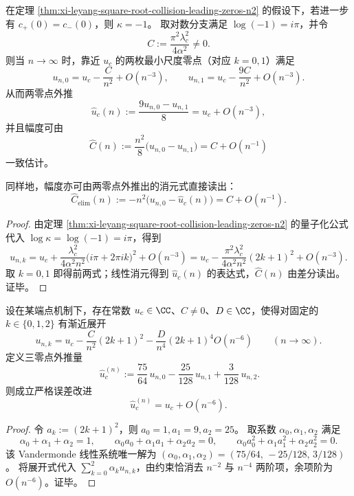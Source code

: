 \begin{corollary}[对称可见性下的两零点外推与幅度消去]\label{cor:xi-leyang-two-leading-zeros-extrapolate-uc}
在定理 \ref{thm:xi-leyang-square-root-collision-leading-zeros-n2} 的假设下，若进一步有 \(c_+(0)=c_-(0)\)，则 \(\kappa=-1\)。
取对数分支满足 \(\log(-1)=i\pi\)，并令
\[
C:=\frac{\pi^2\lambda_c^2}{4\alpha^2}\neq 0.
\]
则当 \(n\to\infty\) 时，靠近 \(u_c\) 的两枚最小尺度零点（对应 \(k=0,1\)）满足
\[
u_{n,0}=u_c-\frac{C}{n^2}+O(n^{-3}),
\qquad
u_{n,1}=u_c-\frac{9C}{n^2}+O(n^{-3}).
\]
从而两零点外推
\[
\widehat u_c(n):=\frac{9u_{n,0}-u_{n,1}}{8}
=u_c+O(n^{-3}),
\]
并且幅度可由
\[
\widehat C(n):=\frac{n^2}{8}\bigl(u_{n,0}-u_{n,1}\bigr)=C+O(n^{-1})
\]
一致估计。
\par
同样地，幅度亦可由两零点外推出的消元式直接读出：
\[
\widehat C_{\mathrm{elim}}(n):=-n^2\bigl(u_{n,0}-\widehat u_c(n)\bigr)=C+O(n^{-1}).
\]
\end{corollary}
\begin{proof}
由定理 \ref{thm:xi-leyang-square-root-collision-leading-zeros-n2} 的量子化公式代入 \(\log\kappa=\log(-1)=i\pi\)，得到
\[
u_{n,k}
=u_c+\frac{\lambda_c^2}{4\alpha^2n^2}\bigl(i\pi+2\pi i k\bigr)^2+O(n^{-3})
=u_c-\frac{\pi^2\lambda_c^2}{4\alpha^2n^2}(2k+1)^2+O(n^{-3}).
\]
取 \(k=0,1\) 即得前两式；线性消元得到 \(\widehat u_c(n)\) 的表达式，\(\widehat C(n)\) 由差分读出。证毕。
\end{proof}

\begin{theorem}\label{thm:xi-leyang-three-leading-zeros-extrapolate-uc-n6}
设在某端点机制下，存在常数 \(u_c\in\CC\)、\(C\neq 0\)、\(D\in\CC\)，使得对固定的 \(k\in\{0,1,2\}\) 有渐近展开
\[
u_{n,k}
=
u_c
-\frac{C}{n^{2}}(2k+1)^{2}
-\frac{D}{n^{4}}(2k+1)^{4}
O(n^{-6})
\qquad(n\to\infty).
\]
定义三零点外推量
\[
\boxed{\
\widehat u_{c}^{(n)}
:=\frac{75}{64}\,u_{n,0}-\frac{25}{128}\,u_{n,1}+\frac{3}{128}\,u_{n,2}.
}
\]
则成立严格误差改进
\[
\boxed{\ \widehat u_{c}^{(n)}=u_{c}+O(n^{-6}).\ }
\]
\end{theorem}
\begin{proof}
令 \(a_k:=(2k+1)^2\)，则 \(a_0=1,a_1=9,a_2=25\)。
取系数 \(\alpha_0,\alpha_1,\alpha_2\) 满足
\[
\alpha_0+\alpha_1+\alpha_2=1,\qquad
\alpha_0a_0+\alpha_1a_1+\alpha_2a_2=0,\qquad
\alpha_0a_0^2+\alpha_1a_1^2+\alpha_2a_2^2=0.
\]
该 Vandermonde 线性系统唯一解为
\(
(\alpha_0,\alpha_1,\alpha_2)=(75/64,\,-25/128,\,3/128)
\)。
将展开式代入 \(\sum_{k=0}^2\alpha_k u_{n,k}\)，由约束恰消去 \(n^{-2}\) 与 \(n^{-4}\) 两阶项，余项阶为 \(O(n^{-6})\)。证毕。
\end{proof}

